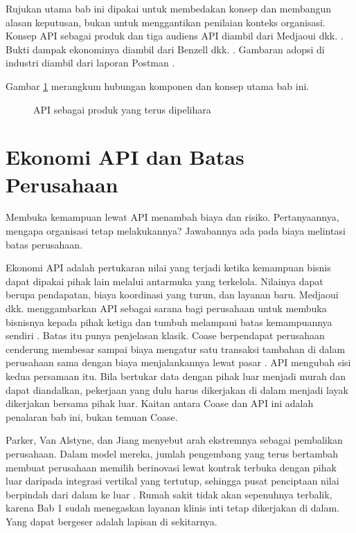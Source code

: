 Rujukan utama bab ini dipakai untuk membedakan konsep dan membangun alasan keputusan, bukan untuk
menggantikan penilaian konteks organisasi. Konsep API sebagai produk dan tiga audiens API diambil dari
Medjaoui dkk. \cite{medjaoui2021continuous}. Bukti dampak ekonominya diambil dari Benzell dkk.
\cite{benzell2024apis}. Gambaran adopsi di industri diambil dari laporan Postman \cite{postman2025}.

Gambar \ref{fig:ch04-ilustrasi-bab} merangkum hubungan komponen dan konsep utama bab ini.
\begin{figure}[!htb]
  \centering
  
  \caption{API sebagai produk yang terus dipelihara}
  \label{fig:ch04-ilustrasi-bab}
\end{figure}

\section{Ekonomi API dan Batas Perusahaan}

Membuka kemampuan lewat API menambah biaya dan risiko. Pertanyaannya, mengapa organisasi tetap
melakukannya? Jawabannya ada pada biaya melintasi batas perusahaan.

Ekonomi API adalah pertukaran nilai yang terjadi ketika kemampuan bisnis dapat dipakai pihak lain
melalui antarmuka yang terkelola. Nilainya dapat berupa pendapatan, biaya koordinasi yang turun, dan
layanan baru. Medjaoui dkk. menggambarkan API sebagai sarana bagi perusahaan untuk membuka bisnisnya
kepada pihak ketiga dan tumbuh melampaui batas kemampuannya sendiri \cite{medjaoui2021continuous}.
Batas itu punya penjelasan klasik. Coase berpendapat perusahaan cenderung membesar sampai biaya
mengatur satu transaksi tambahan di dalam perusahaan sama dengan biaya menjalankannya lewat pasar
\cite{c04-coase1937firm}. API mengubah sisi kedua persamaan itu. Bila bertukar data dengan pihak luar
menjadi murah dan dapat diandalkan, pekerjaan yang dulu harus dikerjakan di dalam menjadi layak
dikerjakan bersama pihak luar. Kaitan antara Coase dan API ini adalah penalaran bab ini, bukan temuan
Coase.

Parker, Van Alstyne, dan Jiang menyebut arah ekstremnya sebagai pembalikan perusahaan. Dalam model
mereka, jumlah pengembang yang terus bertambah membuat perusahaan memilih berinovasi lewat kontrak
terbuka dengan pihak luar daripada integrasi vertikal yang tertutup, sehingga pusat penciptaan nilai
berpindah dari dalam ke luar \cite{parker2017ecosystems}. Rumah sakit tidak akan sepenuhnya terbalik,
karena Bab 1 sudah menegaskan layanan klinis inti tetap dikerjakan di dalam. Yang dapat bergeser
adalah lapisan di sekitarnya.


